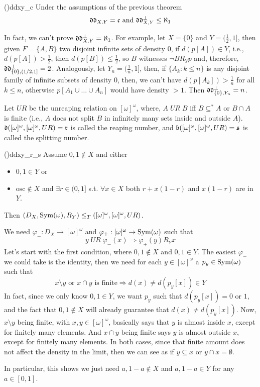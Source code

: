 \begin{corollary}{(\cite{brech})}{ddxy_c}
    Under the assumptions of the previous theorem
    $$\mathfrak{dd}_{X,Y}=\mathfrak{c}\text{ and }\mathfrak{dd}_{X,Y}^\bot\leq\aleph_1$$
\end{corollary}

In fact, we can't prove $\mathfrak{dd}_{X,Y}^\bot=\aleph_1$. For example, let $X=\{0\}$ and $Y=(\tfrac12,1]$, then given $F=\{A,B\}$ two disjoint infinite sets of density $0$, if $d(p[A])\in Y$, i.e., $d(p[A])>\frac12$, then $d(p[B])\leq\frac12$, so $B$ witnesses $\neg BR_Yp$ and, therefore, $\mathfrak{dd}_{\{0\},(1/2,1]}^\bot=2$. Analogously, let $Y_n=(\frac1n,1]$, then, if $\{A_k:k\leq n\}$ is any disjoint family of infinite subsets of density $0$, then, we can't have $d(p[A_k])>\frac1n$ for all $k\leq n$, otherwise $p[A_1\cup\dots\cup A_n]$ would have density $>1$. Then $\mathfrak{dd}_{\{0\},Y_n}^\bot=n$.

Let $UR$ be the unreaping relation on $[\omega]^\omega$, where, $A\;UR\;B$ iff $B\subseteq^*A$ or $B\cap A$ is finite (i.e., $A$ does not split $B$ in infinitely many sets inside and outside $A$). $\mathfrak{d}([\omega]^\omega,[\omega]^\omega,UR)=\mathfrak{r}$ is called the reaping number, and $\mathfrak{b}([\omega]^\omega,[\omega]^\omega,UR)=\mathfrak{s}$ is called the splitting number.

\begin{theorem}{(\cite{brech})}{ddxy_r_s}
    Assume $0,1\notin X$ and either
    \begin{itemize}
        \item $0,1\in Y$ or
        \item $\text{osc}\notin X$ and $\exists r\in(0,1]$ s.t. $\forall x\in X$ both $r+x(1-r)$ and $x(1-r)$ are in $Y$.
    \end{itemize}
    Then $(D_X,\mathrm{Sym}(\omega),R_Y)\leq_T([\omega]^\omega,[\omega]^\omega,UR)$.
\end{theorem}

\begin{sketch}
    We need $\varphi_-:D_X\to[\omega]^\omega$ and $\varphi_+:[\omega]^\omega\to\mathrm{Sym}(\omega)$ such that
    $$y\;UR\;\varphi_-(x)\Rightarrow \varphi_+(y)R_Yx$$
    Let's start with the first condition, where $0,1\notin X$ and $0,1\in Y$. The easiest $\varphi_-$ we could take is the identity, then we need for each $y\in[\omega]^\omega$ a $p_y\in\mathrm{Sym}(\omega)$ such that
    $$x\setminus y\text{ or }x\cap y\text{ is finite}\Rightarrow d(x)\neq d(p_y[x])\in Y$$
    In fact, since we only know $0,1\in Y$, we want $p_y$ such that $d(p_y[x])=0$ or $1$, and the fact that $0,1\notin X$ will already guarantee that $d(x)\neq d(p_y[x])$. Now, $x\setminus y$ being finite, with $x,y\in[\omega]^\omega$, basically says that $y$ is almost inside $x$, except for finitely many elements. And $x\cap y$ being finite says $y$ is almost outside $x$, except for finitely many elements. In both cases, since that finite amount does not affect the density in the limit, then we can see as if $y\subseteq x$ or $y\cap x=\emptyset$.

    In particular, this shows we just need $a,1-a\notin X$ and $a,1-a\in Y$ for any $a\in[0,1]$.
\end{sketch}
    
